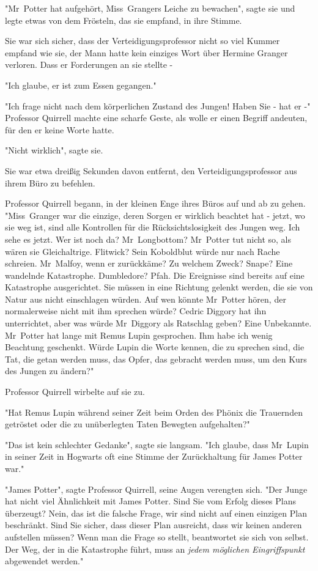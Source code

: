 {"Mr~Potter hat aufgehört, Miss~Grangers Leiche zu bewachen", sagte sie und legte etwas von dem Frösteln, das sie empfand, in ihre Stimme.

Sie war sich sicher, dass der Verteidigungsprofessor nicht so viel Kummer empfand wie sie, der Mann hatte kein einziges Wort über Hermine Granger verloren. Dass er Forderungen an sie stellte -

"Ich glaube, er ist zum Essen gegangen."

"Ich frage nicht nach dem körperlichen Zustand des Jungen! Haben Sie - hat er -" Professor Quirrell machte eine scharfe Geste, als wolle er einen Begriff andeuten, für den er keine Worte hatte.

"Nicht wirklich", sagte sie.

Sie war etwa dreißig Sekunden davon entfernt, den Verteidigungsprofessor aus ihrem Büro zu befehlen.

Professor Quirrell begann, in der kleinen Enge ihres Büros auf und ab zu gehen. "Miss~Granger war die einzige, deren Sorgen er wirklich beachtet hat - jetzt, wo sie weg ist, sind alle Kontrollen für die Rücksichtslosigkeit des Jungen weg. Ich sehe es jetzt. Wer ist noch da? Mr~Longbottom? Mr~Potter tut nicht so, als wären sie Gleichaltrige. Flitwick? Sein Koboldblut würde nur nach Rache schreien. Mr~Malfoy, wenn er zurückkäme? Zu welchem Zweck? Snape? Eine wandelnde Katastrophe. Dumbledore? Pfah. Die Ereignisse sind bereits auf eine Katastrophe ausgerichtet. Sie müssen in eine Richtung gelenkt werden, die sie von Natur aus nicht einschlagen würden. Auf wen könnte Mr~Potter hören, der normalerweise nicht mit ihm sprechen würde? Cedric Diggory hat ihn unterrichtet, aber was würde Mr~Diggory als Ratschlag geben? Eine Unbekannte. Mr~Potter hat lange mit Remus Lupin gesprochen. Ihm habe ich wenig Beachtung geschenkt. Würde Lupin die Worte kennen, die zu sprechen sind, die Tat, die getan werden muss, das Opfer, das gebracht werden muss, um den Kurs des Jungen zu ändern?"

Professor Quirrell wirbelte auf sie zu.

"Hat Remus Lupin während seiner Zeit beim Orden des Phönix die Trauernden getröstet oder die zu unüberlegten Taten Bewegten aufgehalten?"

"Das ist kein schlechter Gedanke", sagte sie langsam. "Ich glaube, dass Mr~Lupin in seiner Zeit in Hogwarts oft eine Stimme der Zurückhaltung für James Potter war."

"James Potter", sagte Professor Quirrell, seine Augen verengten sich. "Der Junge hat nicht viel Ähnlichkeit mit James Potter. Sind Sie vom Erfolg dieses Plans überzeugt? Nein, das ist die falsche Frage, wir sind nicht auf einen einzigen Plan beschränkt. Sind Sie sicher, dass dieser Plan ausreicht, dass wir keinen anderen aufstellen müssen? Wenn man die Frage so stellt, beantwortet sie sich von selbst. Der Weg, der in die Katastrophe führt, muss an \emph{jedem möglichen Eingriffspunkt} abgewendet werden."

}
